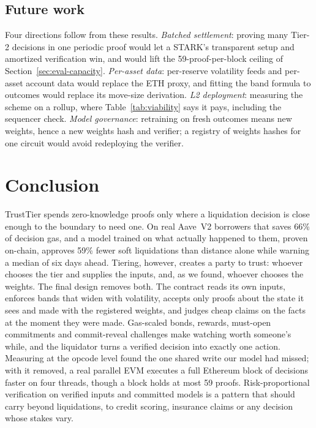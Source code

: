 \documentclass[sigconf,nonacm]{acmart}
\begin{document}
\subsection{Future work}

Four directions follow from these results. \emph{Batched settlement}: proving many Tier-2 decisions in one periodic proof would let a STARK's transparent setup and amortized verification win, and would lift the 59-proof-per-block ceiling of Section~\ref{sec:eval-capacity}. \emph{Per-asset data}: per-reserve volatility feeds and per-asset account data would replace the ETH proxy, and fitting the band formula to outcomes would replace its move-size derivation. \emph{L2 deployment}: measuring the scheme on a rollup, where Table~\ref{tab:viability} says it pays, including the sequencer check. \emph{Model governance}: retraining on fresh outcomes means new weights, hence a new weights hash and verifier; a registry of weights hashes for one circuit would avoid redeploying the verifier.

\section{Conclusion}

TrustTier spends zero-knowledge proofs only where a liquidation decision is close enough to the boundary to need one. On real Aave~V2 borrowers that saves 66\% of decision gas, and a model trained on what actually happened to them, proven on-chain, approves 59\% fewer soft liquidations than distance alone while warning a median of six days ahead. Tiering, however, creates a party to trust: whoever chooses the tier and supplies the inputs, and, as we found, whoever chooses the weights. The final design removes both. The contract reads its own inputs, enforces bands that widen with volatility, accepts only proofs about the state it sees and made with the registered weights, and judges cheap claims on the facts at the moment they were made. Gas-scaled bonds, rewards, must-open commitments and commit-reveal challenges make watching worth someone's while, and the liquidator turns a verified decision into exactly one action. Measuring at the opcode level found the one shared write our model had missed; with it removed, a real parallel EVM executes a full Ethereum block of decisions \pevmHeadline{} faster on four threads, though a block holds at most 59 proofs. Risk-proportional verification on verified inputs and committed models is a pattern that should carry beyond liquidations, to credit scoring, insurance claims or any decision whose stakes vary.
\end{document}
